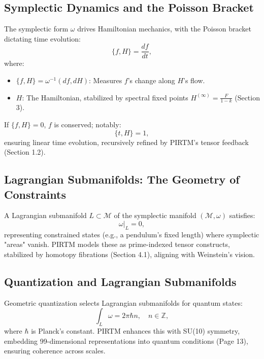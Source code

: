 \documentclass{article}
\theoremstyle{plain}
\begin{document}
\subsection{Symplectic Dynamics and the Poisson Bracket}

The symplectic form \( \omega \) drives Hamiltonian mechanics, with the Poisson bracket dictating time evolution:
\begin{equation}
\{f, H\} = \frac{df}{dt},
\end{equation}
where:
\begin{itemize}
    \item \( \{f, H\} = \omega^{-1}(df, dH) \): Measures \( f \)’s change along \( H \)’s flow.
    \item \( H \): The Hamiltonian, stabilized by spectral fixed points \( H^{(\infty)} = \frac{F}{1 - k} \) (Section 3).
\end{itemize}
If \( \{f, H\} = 0 \), \( f \) is conserved; notably:
\begin{equation}
\{t, H\} = 1,
\end{equation}
ensuring linear time evolution, recursively refined by PIRTM’s tensor feedback (Section 1.2).

\subsection{Lagrangian Submanifolds: The Geometry of Constraints}

A Lagrangian submanifold \( L \subset \mathcal{M} \) of the symplectic manifold \( (\mathcal{M}, \omega) \) satisfies:
\begin{equation}
\omega|_L = 0,
\end{equation}
representing constrained states (e.g., a pendulum’s fixed length) where symplectic "areas" vanish. PIRTM models these as prime-indexed tensor constructs, stabilized by homotopy fibrations (Section 4.1), aligning with Weinstein’s vision.

\subsection{Quantization and Lagrangian Submanifolds}

Geometric quantization selects Lagrangian submanifolds for quantum states:
\begin{equation}
\int_L \omega = 2\pi \hbar n, \quad n \in \mathbb{Z},
\end{equation}
where \( \hbar \) is Planck’s constant. PIRTM enhances this with SU(10) symmetry, embedding 99-dimensional representations into quantum conditions (Page 13), ensuring coherence across scales.
\end{document}
